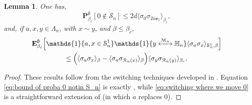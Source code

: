 \documentclass[10pt,a4paper]{amsart}
\numberwithin{equation}{section}
\newtheorem{Lem}[Thm]{Lemma}
\newcommand{\connect}{\xleftrightarrow}
\begin{document}
\begin{Lem} One has,
\begin{equation}\label{eq:bound of proba 0 notin S_n}
	\mathbf P_{\beta_c}^{\emptyset}[0\notin \mathcal S_n]\leq 2d\langle \sigma_0\sigma_{2n\mathbf{e}_1}\rangle_{\beta_c},
\end{equation}
and, if $a,x,y\in \Lambda_n$, with $x\sim y$, and $\beta\leq \beta_c$,
\begin{multline}\label{eq:switching where we move 0}
	\mathbf E_{\beta_c}^\emptyset\Big[\mathds{1}\{a,x\in \mathcal S_n^1\}\mathds{1}\{y\connect{\mathcal M_n\:}\mathbb H_n\}\langle \sigma_a\sigma_x\rangle_{\mathcal S_n^1,\beta}\Big]\\\leq \Big(\langle \sigma_a\sigma_x\rangle_{\beta}-\langle \sigma_a\sigma_{\mathcal R_n(x)}\rangle_{\beta}\Big)\langle \sigma_y\sigma_{\mathcal R_n(y)}\rangle_{\beta_c}.
	\end{multline}
\end{Lem}
\begin{proof} These results follow from the switching techniques developed in \cite[Lemma~2.3]{DuminilPanis2024newLB}. Equation \eqref{eq:bound of proba 0 notin S_n} is exactly \cite[Equation~(2.12)]{DuminilPanis2024newLB}, while \eqref{eq:switching where we move 0} is a straightforward extension of \cite[Equation~(2.28)]{DuminilPanis2024newLB} (in which $a$ replaces $0$).
\end{proof}
\end{document}
